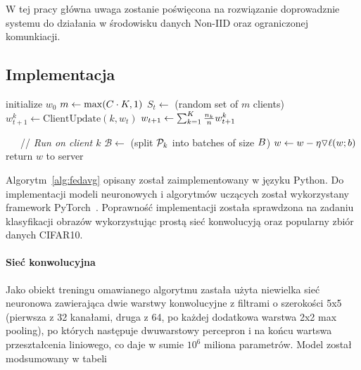 W tej pracy główna uwaga zostanie poświęcona na rozwiązanie doprowadznie systemu do działania w środowisku danych Non-IID oraz ograniczonej komunkiacji.

\subsection{Implementacja}

  \begin{polishalgorithm}[t]
    \begin{algorithmic}
      \STATE{} initialize $w_0$
        \STATE{} $m \leftarrow \max(C\cdot K, 1)$
        \STATE{} $S_t \leftarrow$ (random set of $m$ clients)
          \STATE{} $w_{t+1}^k \leftarrow \text{ClientUpdate}(k, w_t)$ 
        \ENDFOR{}
        \STATE{} $w_{t+1} \leftarrow \sum_{k=1}^K \frac{n_k}{n} w_{t+1}^k$
      \ENDFOR{}
      \STATE{}
    
    \ \ \  // \emph{Run on client $k$}
      \STATE{} $\mathcal{B} \leftarrow$ (split $\mathcal{P}_k$ into batches of size $B$)
          \STATE{} $w \leftarrow w - \eta \triangledown \ell(w; b)$
        \ENDFOR{}
    \ENDFOR{}
    \STATE{} return $w$ to server
    \end{algorithmic}
    \label{alg:fedavg}
    \end{polishalgorithm}


  Algorytm~\ref{alg:fedavg} opisany został zaimplementowany w języku Python. Do implementacji modeli
  neuronowych i algorytmów uczących został wykorzystany framework
  PyTorch~\cite{paszke2017automatic}. Poprawność implementacji została sprawdzona na zadaniu klasyfikacji obrazów wykorzystując prostą sieć konwolucyją oraz popularny zbiór danych CIFAR10. 

  \paragraph{Sieć konwolucyjna}

  Jako obiekt treningu omawianego algorytmu zastała użyta niewielka sieć neuronowa zawierająca
  dwie warstwy konwolucyjne z filtrami o szerokości 5x5 (pierwsza z 32 kanałami, druga z 64, po
  każdej dodatkowa warstwa 2x2 max pooling), po których następuje dwuwarstowy percepron i na
  końcu wartswa przeształcenia liniowego, co daje w sumie \(10^6\) miliona parametrów. Model został modsumowany w tabeli 


